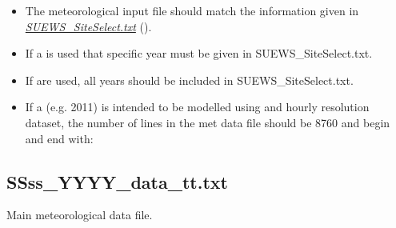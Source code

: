 \documentclass[letterpaper,10pt,english]{sphinxmanual}
\begin{document}
\begin{itemize}
\item {} 
The meteorological input file should match the information given in
{\hyperref[\detokenize{input_files/met_input:SUEWS_SiteSelect.txt}]{\emph{SUEWS\_SiteSelect.txt}}} ().

\item {} 
If a  is used that specific year must be given in
SUEWS\_SiteSelect.txt.

\item {} 
If  are used, all years should be included in
SUEWS\_SiteSelect.txt.

\item {} 
If a  (e.g. 2011) is intended to be modelled using and
hourly resolution dataset, the number of lines in the met data file
should be 8760 and begin and end with:

\end{itemize}

\begin{DUlineblock}{0em}
\item[] 
\item[] 
\item[] 
\item[] 
\end{DUlineblock}


\subsection{SSss\_YYYY\_data\_tt.txt}
\label{\detokenize{input_files/met_input:ssss-yyyy-data-tt-txt}}
Main meteorological data file.
\end{document}
